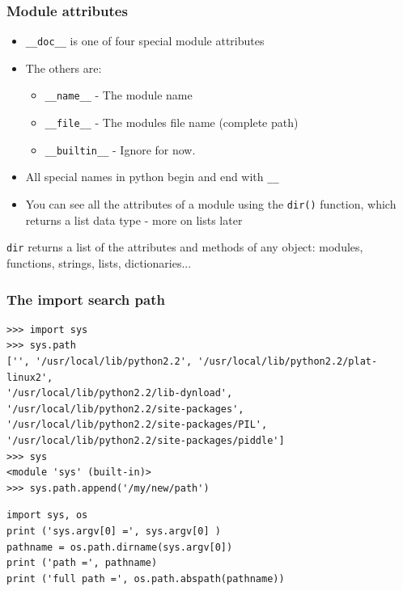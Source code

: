 \documentclass{beamer}
\begin{document}
\begin{frame}
\frametitle{Module attributes}
\begin{itemize}
\item \texttt{\_\_doc\_\_} is one of four special module attributes
\item The others are:
\begin{itemize}
\item \texttt{\_\_name\_\_} - The module name
\item \texttt{\_\_file\_\_} - The modules file name (complete path)
\item \texttt{\_\_builtin\_\_} - Ignore for now.
\end{itemize}
\item All special names in python begin and end with \texttt{\_\_}
\item You can see all the attributes of a module using the \texttt{dir()} function, which returns a list data type - more on lists later
\end{itemize}
\texttt{dir} returns a list of the attributes and methods of any object: modules, functions, strings, lists, dictionaries... 
\end{frame}

\begin{frame}[containsverbatim]
\frametitle{The import search path}
\begin{lstlisting}
>>> import sys                 
>>> sys.path                   
['', '/usr/local/lib/python2.2', '/usr/local/lib/python2.2/plat-linux2', 
'/usr/local/lib/python2.2/lib-dynload', '/usr/local/lib/python2.2/site-packages', 
'/usr/local/lib/python2.2/site-packages/PIL', 
'/usr/local/lib/python2.2/site-packages/piddle']
>>> sys                        
<module 'sys' (built-in)>
>>> sys.path.append('/my/new/path') 
\end{lstlisting}
\begin{lstlisting}
import sys, os
print ('sys.argv[0] =', sys.argv[0] )            
pathname = os.path.dirname(sys.argv[0])        
print ('path =', pathname)
print ('full path =', os.path.abspath(pathname))
\end{lstlisting}
\end{frame}
\end{document}
